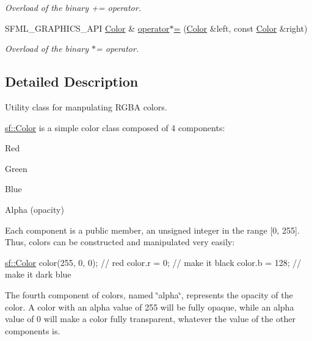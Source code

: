 \begin{DoxyCompactItemize}
\begin{DoxyCompactList}\small\item\em Overload of the binary += operator. \end{DoxyCompactList}\item 
S\+F\+M\+L\+\_\+\+G\+R\+A\+P\+H\+I\+C\+S\+\_\+\+A\+P\+I \hyperlink{classsf_1_1_color}{Color} \& \hyperlink{classsf_1_1_color_a8953be58a47ced92fb25966d6ee90511}{operator$\ast$=} (\hyperlink{classsf_1_1_color}{Color} \&left, const \hyperlink{classsf_1_1_color}{Color} \&right)
\begin{DoxyCompactList}\small\item\em Overload of the binary $\ast$= operator. \end{DoxyCompactList}\end{DoxyCompactItemize}


\subsection{Detailed Description}
Utility class for manpulating R\+G\+B\+A colors. 

\hyperlink{classsf_1_1_color}{sf\+::\+Color} is a simple color class composed of 4 components\+: \begin{DoxyItemize}
\item Red \item Green \item Blue \item Alpha (opacity)\end{DoxyItemize}
Each component is a public member, an unsigned integer in the range \mbox{[}0, 255\mbox{]}. Thus, colors can be constructed and manipulated very easily\+:


\begin{DoxyCode}
\hyperlink{classsf_1_1_color}{sf::Color} color(255, 0, 0); \textcolor{comment}{// red}
color.r = 0;                \textcolor{comment}{// make it black}
color.b = 128;              \textcolor{comment}{// make it dark blue}
\end{DoxyCode}


The fourth component of colors, named \char`\"{}alpha\char`\"{}, represents the opacity of the color. A color with an alpha value of 255 will be fully opaque, while an alpha value of 0 will make a color fully transparent, whatever the value of the other components is.

